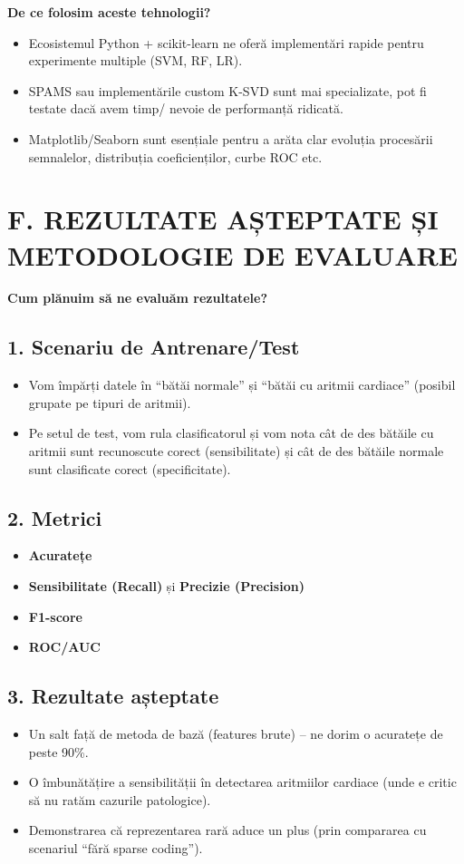 \documentclass[12pt]{article}
\begin{document}
\textbf{De ce folosim aceste tehnologii?}
\begin{itemize}
    \item Ecosistemul Python + scikit-learn ne oferă implementări rapide pentru experimente multiple (SVM, RF, LR).
    \item SPAMS sau implementările custom K-SVD sunt mai specializate, pot fi testate dacă avem timp/ nevoie de performanță ridicată.
    \item Matplotlib/Seaborn sunt esențiale pentru a arăta clar evoluția procesării semnalelor, distribuția coeficienților, curbe ROC etc.
\end{itemize}

\section{F. REZULTATE AȘTEPTATE ȘI METODOLOGIE DE EVALUARE}

\textbf{Cum plănuim să ne evaluăm rezultatele?}

\subsection*{1. Scenariu de Antrenare/Test}
\begin{itemize}
    \item Vom împărți datele în “bătăi normale” și “bătăi cu aritmii cardiace” (posibil grupate pe tipuri de aritmii).
    \item Pe setul de test, vom rula clasificatorul și vom nota cât de des bătăile cu aritmii sunt recunoscute corect (sensibilitate) și cât de des bătăile normale sunt clasificate corect (specificitate).
\end{itemize}

\subsection*{2. Metrici}
\begin{itemize}
    \item \textbf{Acuratețe}
    \item \textbf{Sensibilitate (Recall)} și \textbf{Precizie (Precision)}
    \item \textbf{F1-score}
    \item \textbf{ROC/AUC}
\end{itemize}

\subsection*{3. Rezultate așteptate}
\begin{itemize}
    \item Un salt față de metoda de bază (features brute) -- ne dorim o acuratețe de peste 90\%.
    \item O îmbunătățire a sensibilității în detectarea aritmiilor cardiace (unde e critic să nu ratăm cazurile patologice).
    \item Demonstrarea că reprezentarea rară aduce un plus (prin compararea cu scenariul “fără sparse coding”).
\end{itemize}
\end{document}
